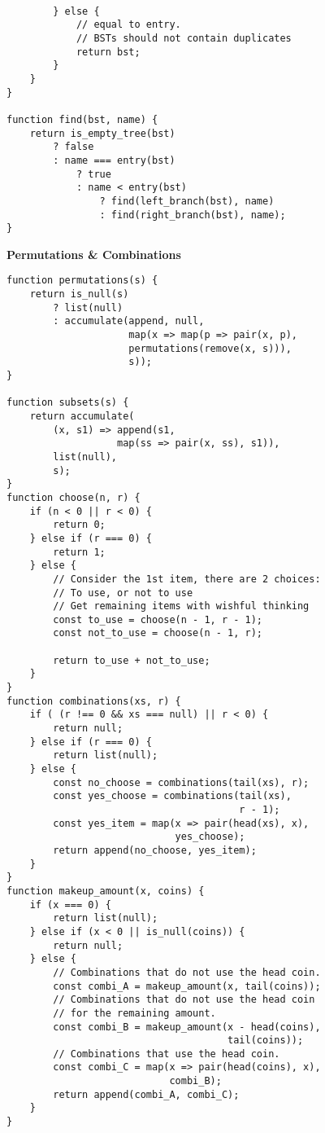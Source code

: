 \documentclass[a4paper]{article} \usepackage[backend=biber, style=numeric, sorting=none]{biblatex}
\begin{document}
\begin{multicols*}{4}
\begin{verbatim}
                              
        } else {
            // equal to entry.
            // BSTs should not contain duplicates
            return bst;
        }
    }
}

function find(bst, name) {
    return is_empty_tree(bst)
        ? false
        : name === entry(bst)
            ? true
            : name < entry(bst)
                ? find(left_branch(bst), name)
                : find(right_branch(bst), name);
}
\end{verbatim}

{\small\textbf{Permutations \& Combinations}}
\begin{verbatim}
function permutations(s) {
    return is_null(s)
        ? list(null)
        : accumulate(append, null,
                     map(x => map(p => pair(x, p),
                     permutations(remove(x, s))),
                     s));
}

function subsets(s) {
    return accumulate(
        (x, s1) => append(s1,
                   map(ss => pair(x, ss), s1)),
        list(null),
        s);
}
function choose(n, r) {
    if (n < 0 || r < 0) {
        return 0;
    } else if (r === 0) {
        return 1;
    } else {
        // Consider the 1st item, there are 2 choices:
        // To use, or not to use
        // Get remaining items with wishful thinking
        const to_use = choose(n - 1, r - 1);
        const not_to_use = choose(n - 1, r);
        
        return to_use + not_to_use;
    }
}
function combinations(xs, r) {
    if ( (r !== 0 && xs === null) || r < 0) {
        return null;
    } else if (r === 0) {
        return list(null);
    } else {
        const no_choose = combinations(tail(xs), r);
        const yes_choose = combinations(tail(xs),
                                        r - 1);
        const yes_item = map(x => pair(head(xs), x),
                             yes_choose);
        return append(no_choose, yes_item);
    }
}
function makeup_amount(x, coins) {
    if (x === 0) {
        return list(null);
    } else if (x < 0 || is_null(coins)) {
        return null;
    } else {
        // Combinations that do not use the head coin.
        const combi_A = makeup_amount(x, tail(coins));
        // Combinations that do not use the head coin
        // for the remaining amount.
        const combi_B = makeup_amount(x - head(coins),
                                      tail(coins));
        // Combinations that use the head coin.
        const combi_C = map(x => pair(head(coins), x),
                            combi_B);
        return append(combi_A, combi_C);
    }
}
\end{verbatim}


\end{multicols*}
\end{document}
